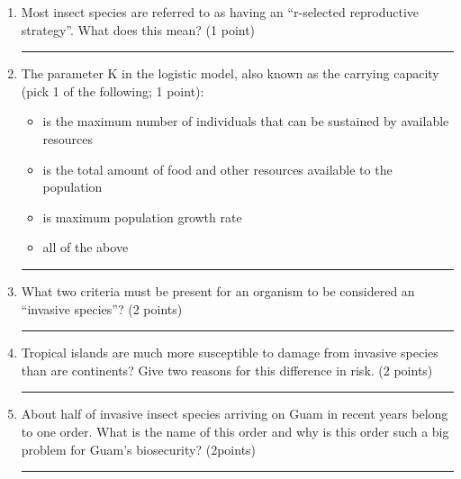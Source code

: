 \documentclass[letter,12pt]{scrartcl}
\begin{document}
\begin{enumerate}
%		
		
		\item Most insect species are referred to as having an “r-selected reproductive strategy”. What does this mean? (1 point)
		\vspace{1in}\hrule
		
		\item The parameter K in the logistic model, also known as the carrying capacity (pick 1 of the following; 1 point):
		\begin{itemize}
			\item is the maximum number of individuals that can be sustained by available resources
			\item is the total amount of food and other resources available to the population
			\item is maximum population growth rate
			\item all of the above			
		\end{itemize}
		\bigskip\hrule
		
%		
		
		\item What two criteria must be present for an organism to be considered an “invasive species”? (2 points)
		\vspace{1in}\hrule
		
		\item Tropical islands are much more susceptible to damage from invasive species than are continents? Give two reasons for this difference in risk. (2 points)
		\vspace{1in}\hrule
		
		\item About half of invasive insect species arriving on Guam in recent years belong to one order. What is the name of this order and why is this order such a big problem for Guam's biosecurity? (2points)
		\vspace{1in}\hrule
		

\end{enumerate}
\end{document}
